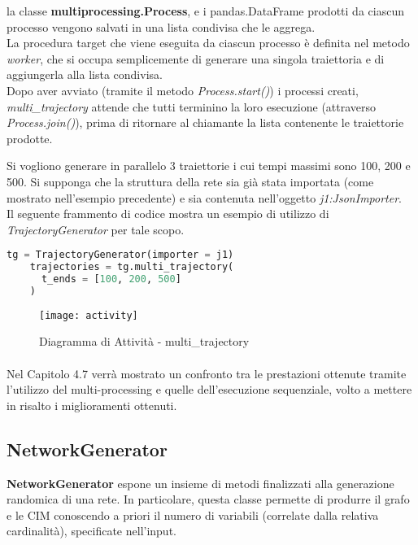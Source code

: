   la classe \textbf{multiprocessing.Process}, e i pandas.DataFrame prodotti da ciascun processo vengono
  salvati in una lista condivisa che le aggrega.\\
  La procedura target che viene eseguita da ciascun processo è definita nel metodo \textit{worker},
  che si occupa semplicemente di generare una singola traiettoria e di aggiungerla alla lista
  condivisa.\\
  Dopo aver avviato (tramite il metodo \textit{Process.start()}) i processi creati, \textit{multi\_trajectory}
  attende che tutti terminino la loro esecuzione (attraverso \textit{Process.join()}), prima di ritornare al chiamante
  la lista contenente le traiettorie prodotte.

  \begin{exmp}
    Si vogliono generare in parallelo 3 traiettorie i cui tempi massimi sono 100, 200 e 500.
    Si supponga che la struttura della rete sia già stata importata (come mostrato nell'esempio
    precedente) e sia contenuta nell'oggetto \emph{j1:JsonImporter}.\\
    Il seguente frammento di codice mostra un esempio di utilizzo di \emph{TrajectoryGenerator} per tale
    scopo.
  \end{exmp}

  \begin{lstlisting}[language=python]
    tg = TrajectoryGenerator(importer = j1)
    trajectories = tg.multi_trajectory(
      t_ends = [100, 200, 500]
    )
  \end{lstlisting}

  \begin{figure}[H]
    \texttt{[image: activity]}
    \centering
    \caption{Diagramma di Attività - multi\_trajectory}
  \end{figure}

  \paragraph{}
  Nel Capitolo 4.7 verrà mostrato un confronto tra le prestazioni ottenute tramite l'utilizzo del multi-processing e quelle dell'esecuzione sequenziale,
  volto a mettere in risalto i miglioramenti ottenuti.

  \subsection{NetworkGenerator}
  \textbf{NetworkGenerator} espone un insieme di metodi finalizzati alla generazione randomica di una rete.
  In particolare, questa classe permette di produrre il grafo e le CIM conoscendo a priori il numero di variabili (correlate dalla relativa cardinalità), 
  specificate nell'input.
  
